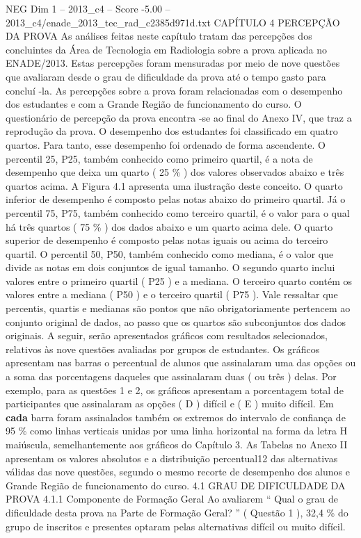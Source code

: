 \begin{textsample}{NEG Dim 1 – 2013\_c4 – Score -5.00 – 2013\_c4/enade\_2013\_tec\_rad\_c2385d971d.txt}  \label{ex:f1_neg_053}
CAPÍTULO 4 PERCEPÇÃO DA PROVA As análises feitas neste capítulo tratam das percepções dos concluintes da Área de Tecnologia em Radiologia sobre a prova aplicada no ENADE/2013.
Estas percepções foram mensuradas por meio de nove questões que avaliaram desde o grau de dificuldade da prova até o tempo gasto para concluí -la.
As percepções sobre a prova foram relacionadas com o desempenho dos estudantes e com a Grande Região de funcionamento do curso.
O questionário de percepção da prova encontra -se ao final do Anexo IV, que traz a reprodução da prova.
O desempenho dos estudantes foi classificado em quatro quartos.
Para tanto, esse desempenho foi ordenado de forma ascendente.
O percentil 25, P25, também conhecido como primeiro quartil, é a nota de desempenho que deixa um quarto ( 25 \% ) dos valores observados abaixo e três quartos acima.
A Figura 4.1 apresenta uma ilustração deste conceito.
O quarto inferior de desempenho é composto pelas notas abaixo do primeiro quartil.
Já o percentil 75, P75, também conhecido como terceiro quartil, é o valor para o qual há três quartos ( 75 \% ) dos dados abaixo e um quarto acima dele.
O quarto superior de desempenho é composto pelas notas iguais ou acima do terceiro quartil.
O percentil 50, P50, também conhecido como mediana, é o valor que divide as notas em dois conjuntos de igual tamanho.
O segundo quarto inclui valores entre o primeiro quartil ( P25 ) e a mediana.
O terceiro quarto contém os valores entre a mediana ( P50 ) e o terceiro quartil ( P75 ).
Vale ressaltar que percentis, quartis e medianas são pontos que não obrigatoriamente pertencem ao conjunto original de dados, ao passo que os quartos são subconjuntos dos dados originais.
A seguir, serão apresentados gráficos com resultados selecionados, relativos às nove questões avaliadas por grupos de estudantes.
Os gráficos apresentam nas barras o percentual de alunos que assinalaram uma das opções ou a soma das porcentagens daqueles que assinalaram duas ( ou três ) delas.
Por exemplo, para as questões 1 e 2, os gráficos apresentam a porcentagem total de participantes que assinalaram as opções ( D ) difícil e ( E ) muito difícil.
Em \textbf{cada} barra foram assinalados também os extremos do intervalo de confiança de 95 \% como linhas verticais unidas por uma linha horizontal na forma da letra H maiúscula, semelhantemente aos gráficos do Capítulo 3.
As Tabelas no Anexo II apresentam os valores absolutos e a distribuição percentual12 das alternativas válidas das nove questões, segundo o mesmo recorte de desempenho dos alunos e Grande Região de funcionamento do curso. 4.1 GRAU DE DIFICULDADE DA PROVA 4.1.1 Componente de Formação Geral Ao avaliarem “ Qual o grau de dificuldade desta prova na Parte de Formação Geral? ” ( Questão 1 ), 32,4 \% do grupo de inscritos e presentes optaram pelas alternativas difícil ou muito difícil.

\end{textsample}
